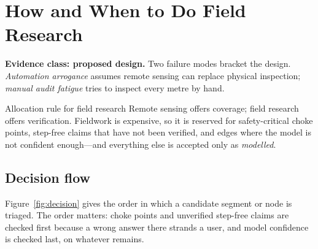 \documentclass[11pt,a4paper]{article}
\newcommand{\evclass}[2]{\noindent\textcolor{#1}{\small\textbf{Evidence class: #2.}}\enspace}
\begin{document}
\section{How and When to Do Field Research}\label{sec:field}

\evclass{pijakblue}{proposed design}
Two failure modes bracket the design. \emph{Automation arrogance} assumes remote sensing can replace
physical inspection; \emph{manual audit fatigue} tries to inspect every metre by hand.

\begin{conceptbox}{Allocation rule for field research}
Remote sensing offers coverage; field research offers verification. Fieldwork is expensive, so it is
reserved for safety-critical choke points, step-free claims that have not been verified, and edges
where the model is not confident enough---and everything else is accepted only as \emph{modelled}.
\end{conceptbox}

\subsection{Decision flow}

Figure~\ref{fig:decision} gives the order in which a candidate segment or node is triaged. The order matters:
choke points and unverified step-free claims are checked first because a wrong answer there strands a
user, and model confidence is checked last, on whatever remains.
\end{document}
